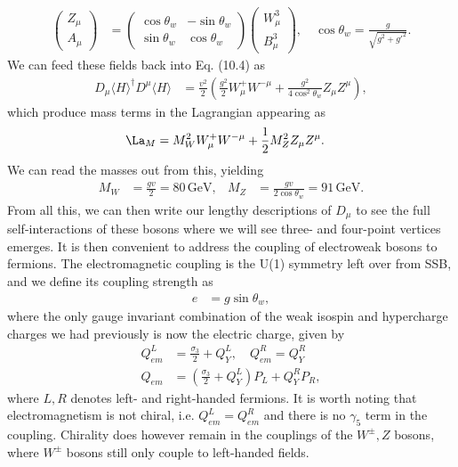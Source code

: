 \documentclass[relqm.tex]{subfiles}
\begin{document}
\begin{align}
    \begin{pmatrix} Z_\mu \\ A_\mu \end{pmatrix} &= \begin{pmatrix} \cos\theta_w & -\sin\theta_w \\ \sin\theta_w & \cos\theta_w\end{pmatrix}\begin{pmatrix} W_\mu^3 \\ B_\mu^3\end{pmatrix}, \quad \cos\theta_w = \frac{g}{\sqrt{g^2+g'^2}}.
\end{align}
We can feed these fields back into Eq. (10.4) as
\begin{align}
    D_\mu\langle H\rangle^\dagger D^\mu\langle H\rangle &= \frac{v^2}{2}\left(\frac{g^2}{2}W_\mu^+W^{-\mu} + \frac{g^2}{4\cos^2\theta_w}Z_\mu Z^\mu\right),
\end{align}
which produce mass terms in the Lagrangian appearing as
\begin{align}
    \La_M &= M_W^2W_\mu^+ W^{-\mu} + \frac12 M_Z^2 Z_\mu Z^\mu.
\end{align}
We can read the masses out from this, yielding
\begin{align}
    M_W &= \frac{gv}{2} = 80\,\text{GeV}, & M_Z &= \frac{gv}{2\cos\theta_w} = 91\,\text{GeV}.
\end{align}
From all this, we can then write our lengthy descriptions of $D_\mu$ to see the full self-interactions of these bosons where we will see three- and four-point vertices emerges. 
It is then convenient to address the coupling of electroweak bosons to fermions. 
The electromagnetic coupling is the U(1) symmetry left over from SSB, and we define its coupling strength as 
\begin{align}
    e &= g\sin\theta_w,
\end{align}
where the only gauge invariant combination of the weak isospin and hypercharge charges we had previously is now the electric charge, given by
\begin{align}
    Q^L_{em} &= \frac{\sigma_3}{2} + Q^L_Y,\quad Q_{em}^R = Q_Y^R \\
    Q_{em} &= \left(\frac{\sigma_3}{2}+Q_Y^L\right)P_L + Q_Y^RP_R,
\end{align}
where $L,R$ denotes left- and right-handed fermions. 
It is worth noting that electromagnetism is not chiral, i.e. $Q_{em}^L = Q^R_{em}$ and there is no $\gamma_5$ term in the coupling. 
Chirality does however remain in the couplings of the $W^\pm,Z$ bosons, where $W^\pm$ bosons still only couple to left-handed fields.  
\end{document}
